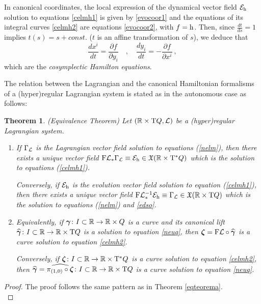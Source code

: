 \documentclass[12pt]{report}
\newtheorem{teor}{Theorem}[chapter]
\def\ben{\begin{enumerate}}
\def\een{\end{enumerate}}
\def\qed{\ifvmode\removelastskip\fi
{\unskip\nobreak\hfil\penalty50\hbox{}\nobreak\hfil
\hbox{\vrule height1.2ex width1.2ex}\parfillskip=0pt
\finalhyphendemerits=0 \par\smallskip}}
\def\vf{\mathfrak X}
\def\Lag{{\cal L}}
\def\Real{\mathbb{R}}
\def\Tan{{\rm T}}
\begin{document}
In canonical coordinates, the local expression 
of the dynamical vector field ${\cal E}_{\rm h}$ solution to equations 
\eqref{celmh1} is given by \eqref{evocoor1}
and the equations of its integral curves \eqref{celmh2} are
equations \eqref{evocoor2}, with $f={\rm h}$.
Then, since $\displaystyle\frac{dt}{ds}=1$ implies $t(s)=s+ const.$
($t$ is an affine transformation of $s$), we deduce that
$$
\frac{dx^i}{dt} = \frac{\partial f}{\partial y_i} \quad ,\quad 
\frac{dy_i}{dt}= -\frac{\partial f}{\partial x^i}\ ,
$$
which are the {\sl cosymplectic Hamilton equations}.

The relation between the Lagrangian and the canonical Hamiltonian formalisms of a (hyper)regular Lagrangian system is stated as in the autonomous case as follows:

\begin{teor} {\rm (Equivalence Theorem)}
Let $(\Real\times\Tan Q,\Lag)$ be a (hyper)regular Lagrangian system.
\ben
\item
If $\Gamma_\Lag$ is the Lagrangian vector field 
solution to equations (\ref{nelm}),
then there exists a unique vector field
 ${\rm F}\Lag_*\Gamma_\Lag\equiv {\cal E}_{\rm h}\in\vf (\Real\times\Tan^*Q)$
which is the solution to equations (\ref{celmh1}).

Conversely, if ${\cal E}_{\rm h}$ is the evolution vector field
solution to equation (\ref{celmh1}),
then there exists a unique vector field
 ${\rm F}\Lag_*^{-1}{\cal E}_{\rm h}\equiv \Gamma_\Lag\in\vf (\Real\times\Tan Q)$
which is the solution to equations (\ref{nelm}) and \eqref{edso}.
\item
Equivalently, if $\mbox{\boldmath$\gamma$}\colon I\subset\Real\to\Real\times Q$ 
is a curve and its canonical lift
$\widehat{\mbox{\boldmath$\gamma$}} \colon I\subset\Real\to\Real\times\Tan Q$ is a
solution to equation \eqref{neuq},
then ${\mbox{\boldmath$\zeta$}}={\rm F}\Lag\circ\widehat{\mbox{\boldmath$\gamma$}}$ is a curve
solution to equation \eqref{celmh2}.

Conversely, if ${\mbox{\boldmath$\zeta$}}\colon I\subset\Real\to\Real\times\Tan^*Q$ 
is a curve solution to equation \eqref{celmh2},
then $\widehat{\mbox{\boldmath$\gamma$}}=\widehat{\pi_{(1,0)}\circ{\mbox{\boldmath$\zeta$}}} \colon I\subset\Real\to\Real\times\Tan Q$ 
is a curve solution to equation \eqref{neuq}.
\een
\label{4.26}
\end{teor}
\begin{proof}
The proof follows the same pattern as in Theorem \ref{eqteorema}.
\\ \qed\end{proof}
\end{document}

